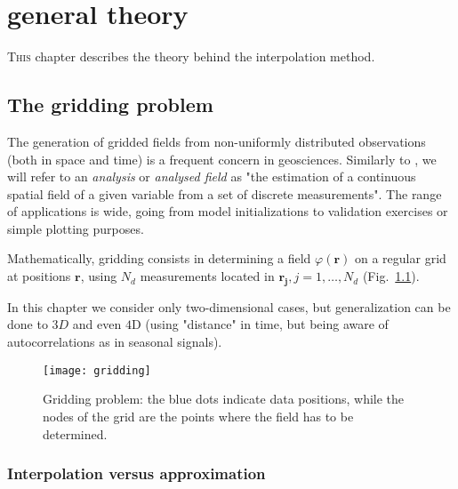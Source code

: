 \chapter{\diva\divaspace general theory\label{chaptheory}}
\vspace*{-2cm}
\lettrine[lines=2, loversize=-0.1, lraise=0.1]{T}{his} chapter describes the theory behind the \diva interpolation method. 

\minitoc


\section{The gridding problem\label{gridding}}

The generation of gridded fields from non-uniformly distributed observations (both in space and time) is a frequent concern in geosciences. Similarly to \citet{OOYAMA87}, we will refer to an \textit{analysis} or \textit{analysed field} as "the estimation of a continuous spatial field of a given variable from a set of discrete measurements". The range of applications is wide, going from model initializations to validation exercises  or simple plotting purposes. 

Mathematically, gridding consists in determining a field $\varphi(\mathbf{r})$ on a regular grid at positions $\mathbf{r}$, using $N_{d}$ measurements located in $\mathbf{r_{j}}, j=1,\ldots, N_{d}$ (Fig.~\ref{gridproblem}).  

In this chapter we consider only two-dimensional cases, but generalization can be done to $3D$ and even $4$D (using "distance" in time, but being aware of autocorrelations as in seasonal signals).

\begin{figure}[htpb]
	\centering
	\parbox{.5\textwidth}{
		\texttt{[image: gridding]}
		}\parbox{.5\textwidth}{
		\caption{Gridding problem: the blue dots indicate data positions, while the nodes of the grid  are the points where the field has to be determined.\label{gridproblem}}
		}
\end{figure}

\subsection{Interpolation versus approximation}

